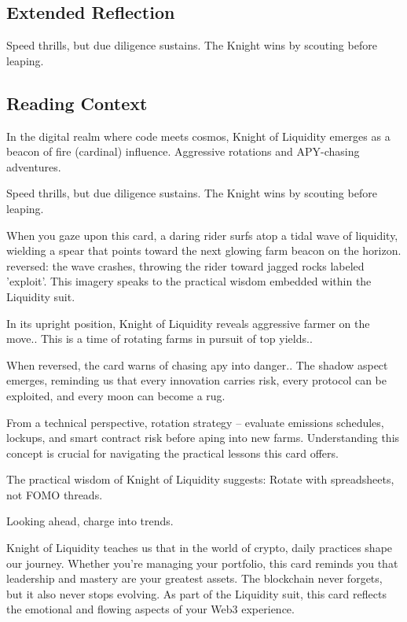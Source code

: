 \documentclass[11pt,oneside]{book}
\begin{document}
\begin{minipage}[t]{0.55\textwidth}
  \subsection*{Extended Reflection}
  Speed thrills, but due diligence sustains. The Knight wins by scouting before leaping.

  \subsection*{Reading Context}
  In the digital realm where code meets cosmos, Knight of Liquidity emerges as a beacon of fire (cardinal) influence. Aggressive rotations and APY-chasing adventures.

  Speed thrills, but due diligence sustains. The Knight wins by scouting before leaping.

  When you gaze upon this card, a daring rider surfs atop a tidal wave of liquidity, wielding a spear that points toward the next glowing farm beacon on the horizon. reversed: the wave crashes, throwing the rider toward jagged rocks labeled 'exploit'. This imagery speaks to the practical wisdom embedded within the Liquidity suit.

  In its upright position, Knight of Liquidity reveals aggressive farmer on the move.. This is a time of rotating farms in pursuit of top yields..

  When reversed, the card warns of chasing apy into danger.. The shadow aspect emerges, reminding us that every innovation carries risk, every protocol can be exploited, and every moon can become a rug.

  From a technical perspective, rotation strategy – evaluate emissions schedules, lockups, and smart contract risk before aping into new farms. Understanding this concept is crucial for navigating the practical lessons this card offers.

  The practical wisdom of Knight of Liquidity suggests: Rotate with spreadsheets, not FOMO threads.

  Looking ahead, charge into trends.

  Knight of Liquidity teaches us that in the world of crypto, daily practices shape our journey. Whether you're managing your portfolio, this card reminds you that leadership and mastery are your greatest assets. The blockchain never forgets, but it also never stops evolving. As part of the Liquidity suit, this card reflects the emotional and flowing aspects of your Web3 experience.

\end{minipage}
\end{document}
